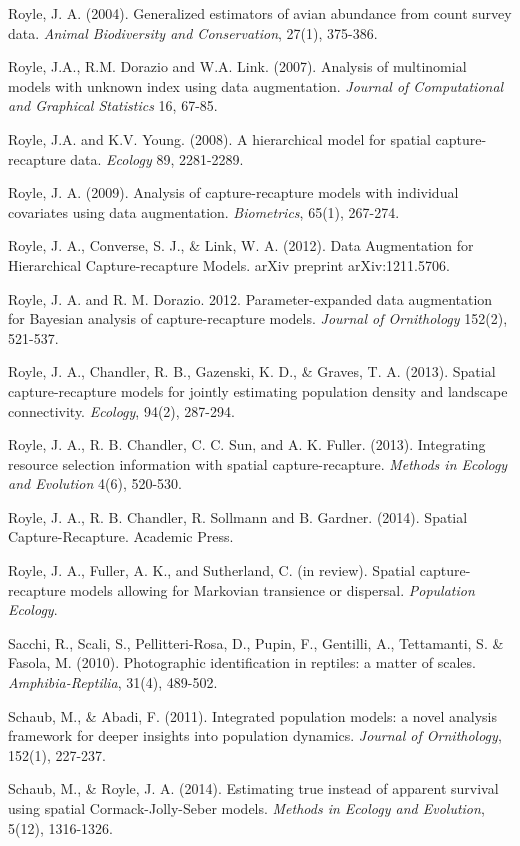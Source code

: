 \documentclass{book}
\begin{document}
\rf Royle, J. A. (2004). Generalized estimators of avian abundance from count survey data. \textit{Animal Biodiversity and Conservation}, 27(1), 375-386.

\rf Royle, J.A., R.M. Dorazio and W.A. Link. (2007). Analysis of multinomial models with unknown index using data augmentation. {\it Journal of Computational and Graphical Statistics}  16, 67-85.

\rf Royle, J.A. and K.V. Young. (2008). A hierarchical model for spatial capture-recapture data. {\it Ecology}  89, 2281-2289.

\rf Royle, J. A. (2009). Analysis of capture-recapture models with individual covariates using data augmentation. {\it Biometrics}, 65(1), 267-274.

\rf Royle, J. A., Converse, S. J., \& Link, W. A. (2012). Data Augmentation for Hierarchical Capture-recapture Models. arXiv preprint arXiv:1211.5706.

\rf Royle, J. A. and R. M. Dorazio. 2012. Parameter-expanded data augmentation for Bayesian analysis of capture-recapture models. {\it Journal of Ornithology} 152(2), 521-537.

\rf Royle, J. A., Chandler, R. B., Gazenski, K. D., \& Graves, T. A. (2013). Spatial capture-recapture models for jointly estimating population density and landscape connectivity. \textit{Ecology}, 94(2), 287-294.

\rf Royle, J. A., R. B. Chandler, C. C. Sun, and A. K. Fuller. (2013). Integrating resource selection information with spatial capture-recapture. {\it Methods in Ecology and Evolution} 4(6), 520-530.

\rf Royle, J. A., R. B. Chandler, R. Sollmann and B. Gardner. (2014). Spatial Capture-Recapture. Academic Press.

\rf Royle, J. A., Fuller, A. K., and Sutherland, C. (in
review). Spatial capture-recapture models allowing for Markovian
transience or dispersal. {\it Population Ecology}.

\rf Sacchi, R., Scali, S., Pellitteri-Rosa, D., Pupin, F., Gentilli, A., Tettamanti, S. \& Fasola, M. (2010). Photographic identification in reptiles: a matter of scales. \textit{Amphibia-Reptilia}, 31(4), 489-502.

\rf Schaub, M., \& Abadi, F. (2011). Integrated population models: a novel analysis framework for deeper insights into population dynamics. \textit{Journal of Ornithology}, 152(1), 227-237.

\rf Schaub, M., \& Royle, J. A. (2014). Estimating true instead of apparent survival using spatial Cormack-Jolly-Seber models. \textit{Methods in Ecology and Evolution}, 5(12), 1316-1326.
\end{document}
